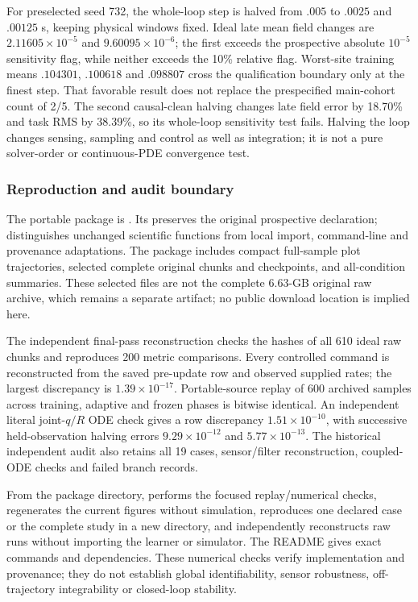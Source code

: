 For preselected seed 732, the whole-loop step is halved from $.005$ to $.0025$
and $.00125$ s, keeping physical windows fixed. Ideal late mean field changes
are $2.11605\times10^{-5}$ and $9.60095\times10^{-6}$; the first exceeds the
prospective absolute $10^{-5}$ sensitivity flag, while neither exceeds the
10\% relative flag. Worst-site training means $.104301$, $.100618$ and
$.098807$ cross the qualification boundary only at the finest step. That
favorable result does not replace the prespecified main-cohort count of 2/5.
The second causal-clean halving changes late field error by 18.70\% and task
RMS by 38.39\%, so its whole-loop sensitivity test fails. Halving the loop
changes sensing, sampling and control as well as integration; it is not a
pure solver-order or continuous-PDE convergence test.

\subsubsection{Reproduction and audit boundary}
The portable package is
.
Its  preserves the original prospective declaration;
 distinguishes unchanged scientific functions from
local import, command-line and provenance adaptations. The package includes
compact full-sample plot trajectories, selected complete original chunks and
checkpoints, and all-condition summaries. These selected files are not the
complete 6.63-GB original raw archive, which remains a separate artifact;
no public download location is implied here.

The independent final-pass reconstruction checks the hashes of all 610 ideal
raw chunks and reproduces 200 metric comparisons. Every controlled command
is reconstructed from the saved pre-update row and observed supplied rates;
the largest discrepancy is $1.39\times10^{-17}$. Portable-source replay of
600 archived samples across training, adaptive and frozen phases is bitwise
identical. An independent literal joint-$q/R$ ODE check gives a row discrepancy
$1.51\times10^{-10}$, with successive held-observation halving errors
$9.29\times10^{-12}$ and $5.77\times10^{-13}$. The historical independent
audit also retains all 19 cases, sensor/filter reconstruction, coupled-ODE
checks and failed branch records.

From the package directory,  performs the focused
replay/numerical checks,  regenerates the current
figures without simulation,  reproduces one declared case or the complete
study in a new directory, and  independently reconstructs
raw runs without importing the learner or simulator. The README gives exact
commands and dependencies. These numerical checks verify implementation and
provenance; they do not establish global identifiability, sensor robustness,
off-trajectory integrability or closed-loop stability.
